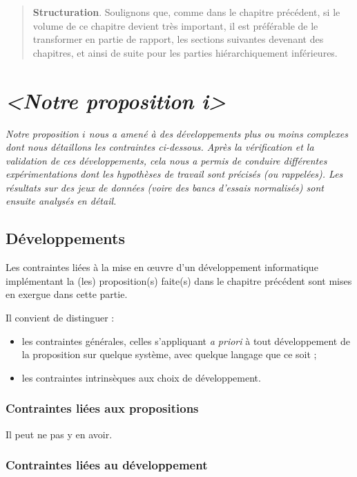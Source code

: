 \documentclass[11pt, french]{report-rd-info}
\newenvironment{structuration}{\begin{quote}\textbf{Structuration}. }{\end{quote}}
\begin{document}
\begin{structuration}
Soulignons que, comme dans le chapitre précédent, si le volume de ce chapitre devient très important, il est préférable de le transformer en partie de rapport, les sections suivantes devenant des chapitres, et ainsi de suite pour les parties hiérarchiquement inférieures.
\end{structuration}

\section{\emph{<Notre proposition \textit{i}>}}

\emph{Notre proposition $i$ nous a amené à des développements plus ou moins complexes dont nous détaillons les contraintes ci-dessous. Après la vérification et la validation de ces développements, cela nous a permis de conduire différentes expérimentations dont les hypothèses de travail sont précisés (ou rappelées). Les résultats sur des jeux de données (voire des bancs d'essais normalisés) sont ensuite analysés en détail.}

\subsection{Développements}

Les contraintes liées à la mise en \oe uvre d'un développement informatique implémentant la (les) proposition(s) faite(s) dans le chapitre précédent sont mises en exergue dans cette partie.

Il convient de distinguer :
\begin{itemize}
	\item les contraintes générales, celles s'appliquant \emph{a priori} à tout développement de la proposition sur quelque système, avec quelque langage que ce soit ;
	\item les contraintes intrinsèques aux choix de développement.
\end{itemize}

\subsubsection{Contraintes liées aux propositions}

Il peut ne pas y en avoir.

\subsubsection{Contraintes liées au développement}
\end{document}
